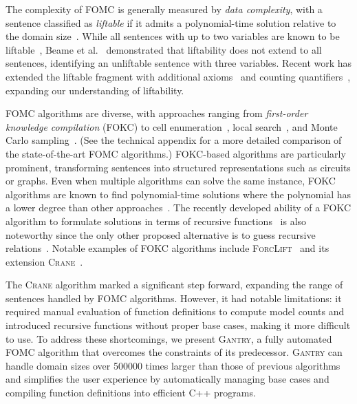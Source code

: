 \documentclass[a4paper,UKenglish,cleveref,autoref,thm-restate]{lipics-v2021}
\newcommand{\Cranetwo}{\textsc{Gantry}}
\begin{document}
The complexity of FOMC is generally measured by \emph{data complexity}, with a
sentence classified as \emph{liftable} if it admits a polynomial-time solution
relative to the domain size~\cite{DBLP:conf/starai/JaegerB12}. While all
sentences with up to two variables are known to be
liftable~\cite{DBLP:conf/nips/Broeck11,DBLP:conf/kr/BroeckMD14}, Beame et
al.~\cite{DBLP:conf/pods/BeameBGS15} demonstrated that liftability does not
extend to all sentences, identifying an unliftable sentence with three
variables. Recent work has extended the liftable fragment with additional
axioms~\cite{DBLP:conf/aaai/TothK23,DBLP:journals/ai/BremenK23} and counting
quantifiers~\cite{DBLP:journals/jair/Kuzelka21}, expanding our understanding of
liftability.

FOMC algorithms are diverse, with approaches ranging from \emph{first-order
  knowledge compilation} (FOKC) to cell
enumeration~\cite{DBLP:conf/uai/BremenK21}, local
search~\cite{DBLP:journals/pvldb/NiuRDS11}, and Monte Carlo
sampling~\cite{DBLP:journals/cacm/GogateD16}. (See the technical appendix for a
more detailed comparison of the state-of-the-art FOMC algorithms.) FOKC-based
algorithms are particularly prominent, transforming sentences into structured
representations such as circuits or graphs. Even when multiple algorithms can
solve the same instance, FOKC algorithms are known to find polynomial-time
solutions where the polynomial has a lower degree than other
approaches~\cite{DBLP:conf/kr/DilkasB23}. The recently developed ability of a
FOKC algorithm to formulate solutions in terms of recursive
functions~\cite{DBLP:conf/kr/DilkasB23} is also noteworthy since the only other
proposed alternative is to guess recursive
relations~\cite{DBLP:conf/ilp/BarvinekB0ZK21}. Notable examples of FOKC
algorithms include \textsc{ForcLift}~\cite{DBLP:conf/ijcai/BroeckTMDR11} and its
extension \textsc{Crane}~\cite{DBLP:conf/kr/DilkasB23}.

The \textsc{Crane} algorithm marked a significant step forward, expanding the
range of sentences handled by FOMC algorithms. However, it had notable
limitations: it required manual evaluation of function definitions to compute
model counts and introduced recursive functions without proper base cases,
making it more difficult to use. To address these shortcomings, we present
\Cranetwo{}, a fully automated FOMC algorithm that overcomes the constraints of
its predecessor. \Cranetwo{} can handle domain sizes over \num{500000} times
larger than those of previous algorithms and simplifies the user experience by
automatically managing base cases and compiling function definitions into
efficient C++ programs.
\end{document}
